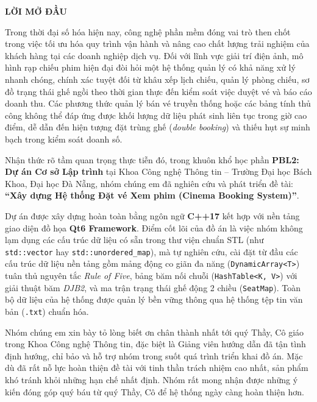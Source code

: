 \documentclass[12pt,a4paper]{article}
\begin{document}
\begin{center}
    \textbf{\Large LỜI MỞ ĐẦU}
\end{center}
\vspace{0.5cm}

Trong thời đại số hóa hiện nay, công nghệ phần mềm đóng vai trò then chốt trong việc tối ưu hóa quy trình vận hành và nâng cao chất lượng trải nghiệm của khách hàng tại các doanh nghiệp dịch vụ. Đối với lĩnh vực giải trí điện ảnh, mô hình rạp chiếu phim hiện đại đòi hỏi một hệ thống quản lý có khả năng xử lý nhanh chóng, chính xác tuyệt đối từ khâu xếp lịch chiếu, quản lý phòng chiếu, sơ đồ trạng thái ghế ngồi theo thời gian thực đến kiểm soát việc duyệt vé và báo cáo doanh thu. Các phương thức quản lý bán vé truyền thống hoặc các bảng tính thủ công không thể đáp ứng được khối lượng dữ liệu phát sinh liên tục trong giờ cao điểm, dễ dẫn đến hiện tượng đặt trùng ghế (\textit{double booking}) và thiếu hụt sự minh bạch trong kiểm soát doanh số.

Nhận thức rõ tầm quan trọng thực tiễn đó, trong khuôn khổ học phần \textbf{PBL2: Dự án Cơ sở Lập trình} tại Khoa Công nghệ Thông tin – Trường Đại học Bách Khoa, Đại học Đà Nẵng, nhóm chúng em đã nghiên cứu và phát triển đề tài: \textbf{``Xây dựng Hệ thống Đặt vé Xem phim (Cinema Booking System)''}.

Dự án được xây dựng hoàn toàn bằng ngôn ngữ \textbf{C++17} kết hợp với nền tảng giao diện đồ họa \textbf{Qt6 Framework}. Điểm cốt lõi của đồ án là việc nhóm không lạm dụng các cấu trúc dữ liệu có sẵn trong thư viện chuẩn STL (như \texttt{std::vector} hay \texttt{std::unordered\_map}), mà tự nghiên cứu, cài đặt từ đầu các cấu trúc dữ liệu nền tảng gồm mảng động co giãn đa năng (\texttt{DynamicArray<T>}) tuân thủ nguyên tắc \textit{Rule of Five}, bảng băm nối chuỗi (\texttt{HashTable<K, V>}) với giải thuật băm \textit{DJB2}, và ma trận trạng thái ghế động 2 chiều (\texttt{SeatMap}). Toàn bộ dữ liệu của hệ thống được quản lý bền vững thông qua hệ thống tệp tin văn bản (\texttt{.txt}) chuẩn hóa.

Nhóm chúng em xin bày tỏ lòng biết ơn chân thành nhất tới quý Thầy, Cô giáo trong Khoa Công nghệ Thông tin, đặc biệt là Giảng viên hướng dẫn đã tận tình định hướng, chỉ bảo và hỗ trợ nhóm trong suốt quá trình triển khai đồ án. Mặc dù đã rất nỗ lực hoàn thiện đề tài với tinh thần trách nhiệm cao nhất, sản phẩm khó tránh khỏi những hạn chế nhất định. Nhóm rất mong nhận được những ý kiến đóng góp quý báu từ quý Thầy, Cô để hệ thống ngày càng hoàn thiện hơn.
\end{document}
